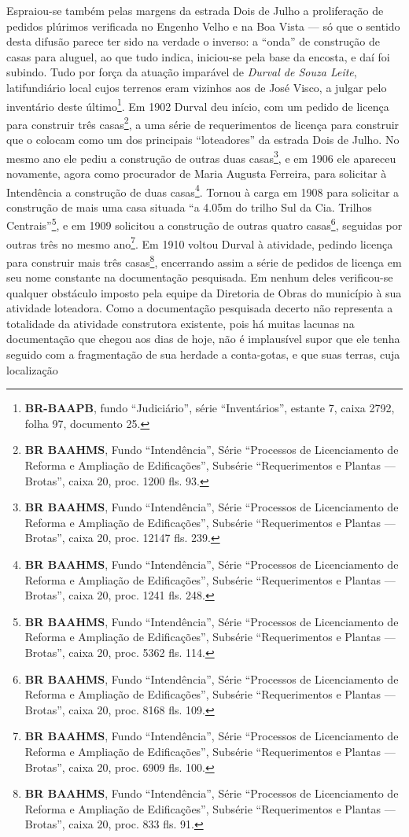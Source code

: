 Espraiou-se também pelas margens da estrada Dois de Julho a proliferação de pedidos plúrimos verificada no Engenho Velho e na Boa Vista --- só que o sentido desta difusão parece ter sido na verdade o inverso: a ``onda'' de construção de casas para aluguel, ao que tudo indica, iniciou-se pela base da encosta, e daí foi subindo. Tudo por força da atuação imparável de \textit{Durval de Souza Leite}, latifundiário local cujos terrenos eram vizinhos aos de José Visco, a julgar pelo inventário deste último\footnote{\textbf{BR-BAAPB}, fundo ``Judiciário'', série ``Inventários'', estante 7, caixa 2792, folha 97, documento 25.}. Em 1902 Durval deu início, com um pedido de licença para construir três casas\footnote{\textbf{BR BAAHMS}, Fundo ``Intendência'', Série ``Processos de Licenciamento de Reforma e Ampliação de Edificações'', Subsérie ``Requerimentos e Plantas --- Brotas'', caixa 20, proc. 1200 fls. 93.}, a uma série de requerimentos de licença para construir que o colocam como um dos principais ``loteadores'' da estrada Dois de Julho. No mesmo ano ele pediu a construção de outras duas casas\footnote{\textbf{BR BAAHMS}, Fundo ``Intendência'', Série ``Processos de Licenciamento de Reforma e Ampliação de Edificações'', Subsérie ``Requerimentos e Plantas --- Brotas'', caixa 20, proc. 12147 fls. 239.}, e em 1906 ele apareceu novamente, agora como procurador de Maria Augusta Ferreira, para solicitar à Intendência a construção de duas casas\footnote{\textbf{BR BAAHMS}, Fundo ``Intendência'', Série ``Processos de Licenciamento de Reforma e Ampliação de Edificações'', Subsérie ``Requerimentos e Plantas --- Brotas'', caixa 20, proc. 1241 fls. 248.}. Tornou à carga em 1908 para solicitar a construção de mais uma casa situada ``a 4.05m do trilho Sul da Cia. Trilhos Centrais''\footnote{\textbf{BR BAAHMS}, Fundo ``Intendência'', Série ``Processos de Licenciamento de Reforma e Ampliação de Edificações'', Subsérie ``Requerimentos e Plantas --- Brotas'', caixa 20, proc. 5362 fls. 114.}, e em 1909 solicitou a construção de outras quatro casas\footnote{\textbf{BR BAAHMS}, Fundo ``Intendência'', Série ``Processos de Licenciamento de Reforma e Ampliação de Edificações'', Subsérie ``Requerimentos e Plantas --- Brotas'', caixa 20, proc. 8168 fls. 109.}, seguidas por outras três no mesmo ano\footnote{\textbf{BR BAAHMS}, Fundo ``Intendência'', Série ``Processos de Licenciamento de Reforma e Ampliação de Edificações'', Subsérie ``Requerimentos e Plantas --- Brotas'', caixa 20, proc. 6909 fls. 100.}. Em 1910 voltou Durval à atividade, pedindo licença para construir mais três casas\footnote{\textbf{BR BAAHMS}, Fundo ``Intendência'', Série ``Processos de Licenciamento de Reforma e Ampliação de Edificações'', Subsérie ``Requerimentos e Plantas --- Brotas'', caixa 20, proc. 833 fls. 91.}, encerrando assim a série de pedidos de licença em seu nome constante na documentação pesquisada. Em nenhum deles verificou-se qualquer obstáculo imposto pela equipe da Diretoria de Obras do município à sua atividade loteadora. Como a documentação pesquisada decerto não representa a totalidade da atividade construtora existente, pois há muitas lacunas na documentação que chegou aos dias de hoje, não é implausível supor que ele tenha seguido com a fragmentação de sua herdade a conta-gotas, e que suas terras, cuja localização 